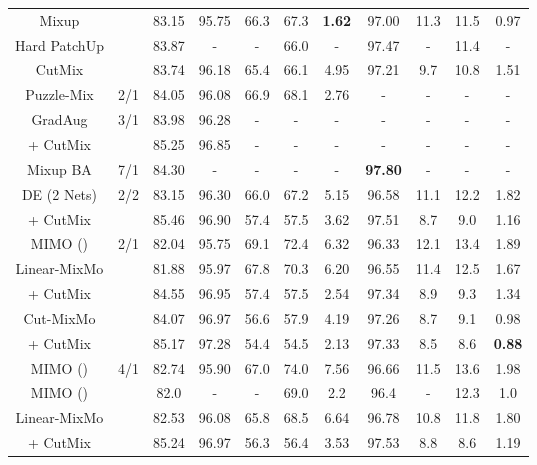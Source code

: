 \documentclass[10pt,twocolumn,letterpaper]{article}
\begin{document}
\begin{table}[!t]
{\begin{tabular}{c | c | c c c c c | c c c c}
        Mixup & & 83.15 & 95.75 & 66.3 & 67.3 & \textbf{1.62} & 97.00 & 11.3 & 11.5 & 0.97 \\
Hard PatchUp & & 83.87 & - & - & 66.0 & - & 97.47 & - & 11.4 & - \\
        CutMix & & 83.74 & 96.18 & 65.4 & 66.1 & 4.95 & 97.21 & 9.7& 10.8 & 1.51 \\
\midrule
        Puzzle-Mix & 2/1 & 84.05 & 96.08& 66.9 & 68.1 & 2.76 & - & -& - & - \\
        \midrule
        GradAug & \multirow{2}{*}{3/1} & 83.98 & 96.28 & -& - & - & - & -& - & - \\
        + CutMix & & 85.25 & 96.85 & -& - & - & - & -& - & - \\
        \midrule
        Mixup BA & 7/1 & 84.30 & - & - & - & - &\textbf{97.80} &- & - &- \\
        \midrule
        DE (2 Nets) & \multirow{2}{*}{2/2} & 83.15 & 96.30 & 66.0 & 67.2 & 5.15 & 96.58 & 11.1& 12.2 & 1.82 \\
        + CutMix & & 85.46 & 96.90 & 57.4& 57.5 & 3.62 & 97.51 & 8.7& 9.0 & 1.16 \\
        \midrule
        \midrule
        MIMO () & \multirow{5}{*}{2/1} & 82.04 & 95.75 & 69.1& 72.4 & 6.32 & 96.33 & 12.1& 13.4 & 1.89 \\
        \cmidrule{1-1}
        \cmidrule{3-11}
        \multirow{1}{*}{Linear-MixMo} & & 81.88 & 95.97 & 67.8& 70.3 & 6.20 & 96.55 & 11.4 & 12.5 & 1.67 \\
        + CutMix & & 84.55 & 96.95 & 57.4& 57.5 & 2.54 & 97.34 & 8.9& 9.3 & 1.34 \\
        \cmidrule{1-1}
        \cmidrule{3-11}
        \multirow{1}{*}{Cut-MixMo} & & 84.07 & 96.97 & 56.6& 57.9 & 4.19 & 97.26 & 8.7& 9.1 & 0.98 \\
        + CutMix & & 85.17 & 97.28 & 54.4& 54.5 & 2.13 & 97.33 & 8.5& 8.6 & \textbf{0.88} \\
        \midrule
        MIMO () & \multirow{6}{*}{4/1} & 82.74 & 95.90 & 67.0& 74.0 & 7.56 & 96.66 & 11.5& 13.6 & 1.98 \\
        MIMO ()& & 82.0 & - & -& 69.0 & 2.2 & 96.4 & -& 12.3 & 1.0 \\
        \cmidrule{1-1}
        \cmidrule{3-11}
        \multirow{1}{*}{Linear-MixMo} & & 82.53 & 96.08 & 65.8& 68.5 & 6.64 & 96.78 & 10.8& 11.8 & 1.80 \\
        + CutMix & & 85.24 & 96.97 & 56.3& 56.4 & 3.53 & 97.53 & 8.8& 8.6 & 1.19 \\
        \cmidrule{1-1}
        \cmidrule{3-11}

\end{tabular}}
\end{table}
\end{document}
